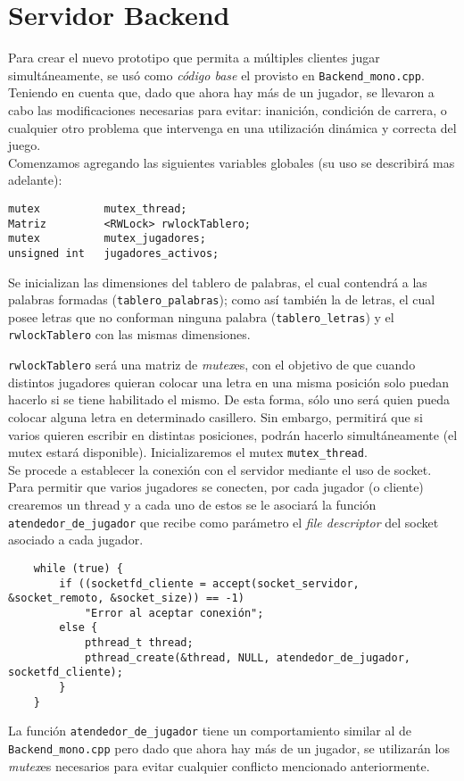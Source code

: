\section{Servidor Backend}
Para crear el nuevo prototipo que permita a múltiples clientes jugar simultáneamente, se us\'o como  \textit{código base} el provisto en \texttt{Backend\_mono.cpp}. Teniendo en cuenta que, dado que ahora hay m\'as de un jugador, se llevaron a cabo las modificaciones necesarias para evitar: inanición, condición de carrera, o cualquier otro problema que intervenga en una utilización dinámica y correcta del juego.\\

Comenzamos agregando las siguientes variables globales (su uso se describirá mas adelante):
\begin{verbatim}
mutex          mutex_thread;
Matriz         <RWLock> rwlockTablero;
mutex          mutex_jugadores;
unsigned int   jugadores_activos;
\end{verbatim}

Se inicializan las dimensiones del tablero de palabras, el cual contendr\'a a las palabras formadas (\texttt{tablero\_palabras}); como así tambi\'en la de letras, el cual posee letras que no conforman ninguna palabra (\texttt{tablero\_letras}) y el \texttt{rwlockTablero} con las mismas dimensiones.

 \texttt{rwlockTablero} ser\'a una matriz de \emph{mutex}es, con el objetivo de que cuando distintos jugadores quieran  colocar una letra en una misma posición solo puedan hacerlo si se tiene habilitado el mismo. De esta forma, s\'olo uno ser\'a quien pueda colocar alguna letra en determinado casillero. Sin embargo, permitir\'a que si varios quieren escribir en distintas posiciones, podrán hacerlo simultáneamente (el mutex estar\'a disponible). Inicializaremos el mutex \texttt{mutex\_thread}.\\

Se procede a establecer la conexión con el servidor mediante el uso de socket. Para permitir que varios jugadores se conecten, por cada jugador (o cliente) crearemos un thread y a cada uno de estos se le asociar\'a la función \texttt{atendedor\_de\_jugador} que recibe como parámetro el \textit{file descriptor} del socket asociado a cada jugador. 

\begin{verbatim}
    while (true) {
        if ((socketfd_cliente = accept(socket_servidor, &socket_remoto, &socket_size)) == -1)
            "Error al aceptar conexión";
        else {
            pthread_t thread;
            pthread_create(&thread, NULL, atendedor_de_jugador, socketfd_cliente);
        }
    }
\end{verbatim}
La funci\'on \texttt{atendedor\_de\_jugador} tiene un comportamiento similar al de \texttt{Backend\_mono.cpp} pero dado que ahora hay m\'as de un jugador, se utilizar\'an los \emph{mutex}es necesarios para evitar cualquier conflicto mencionado anteriormente.\\

